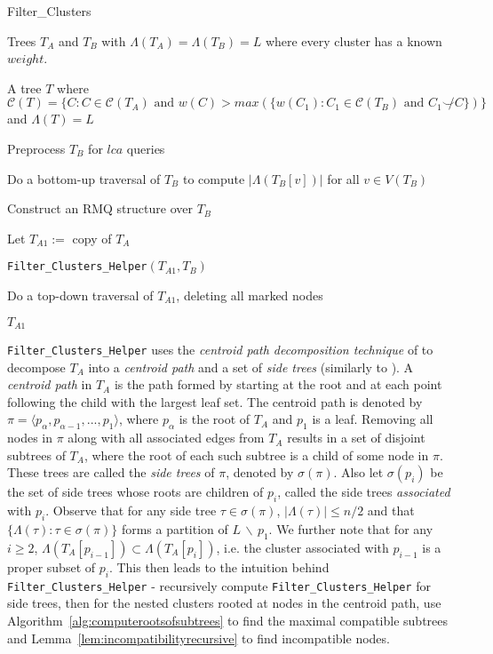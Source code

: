 \documentclass{article}
\newcommand{\compatible}{\smile}
\newcommand{\leafset}{\Lambda}
\begin{document}
    \begin{algorithm}
        \caption{Filter\_Clusters}
        \begin{algorithmic}[1]
            \Input Trees $T_A$ and $T_B$ with $\leafset(T_A) = \leafset(T_B) = L$ where every cluster has a known $weight$.

            \Output A tree $T$ where $\mathcal{C}(T) = \{C : C \in \mathcal{C}(T_A) \text{ and } w(C) > max(\{w(C_1) : C_1 \in \mathcal{C}(T_B) \text{ and } C_1 \not\compatible C\})\}$ and $\leafset(T) = L$

            \State Preprocess $T_B$ for $lca$ queries

            \State Do a bottom-up traversal of $T_B$ to compute $|\leafset(T_B[v])|$ for all $v \in V(T_B)$

            \State Construct an RMQ structure over $T_B$

            \State Let $T_{A1} :=$ copy of $T_A$

            \State \texttt{Filter\_Clusters\_Helper}$(T_{A1}, T_B)$

            \State Do a top-down traversal of $T_{A1}$, deleting all marked nodes

            \State \Return $T_{A1}$
        \end{algorithmic}
    \end{algorithm}

    \texttt{Filter\_Clusters\_Helper} uses the \textit{centroid path decomposition technique} of \cite{cole2000n} to decompose $T_A$ into a \textit{centroid path} and a set of \textit{side trees} (similarly to \cite{jansson2018algorithms}). A \textit{centroid path} in $T_A$ is the path formed by starting at the root and at each point following the child with the largest leaf set. The centroid path is denoted by $\pi = \langle p_{\alpha}, p_{\alpha - 1}, ..., p_1 \rangle$, where $p_{\alpha}$ is the root of $T_A$ and $p_1$ is a leaf. Removing all nodes in $\pi$ along with all associated edges from $T_A$ results in a set of disjoint subtrees of $T_A$, where the root of each such subtree is a child of some node in $\pi$. These trees are called the \textit{side trees} of $\pi$, denoted by $\sigma(\pi)$. Also let $\sigma(p_i)$ be the set of side trees whose roots are children of $p_i$, called the side trees \textit{associated} with $p_i$. Observe that for any side tree $\tau \in \sigma(\pi)$, $|\leafset(\tau)| \leq n/2$ and that $\{\leafset(\tau) : \tau \in \sigma(\pi)\}$ forms a partition of $L\, \backslash\, {p_1}$. We further note that for any $i \geq 2$, $\leafset(T_A[p_{i - 1}]) \subset \leafset(T_A[p_i])$, i.e. the cluster associated with $p_{i-1}$ is a proper subset of $p_i$. This then leads to the intuition behind \texttt{Filter\_Clusters\_Helper} - recursively compute \texttt{Filter\_Clusters\_Helper} for side trees, then for the nested clusters rooted at nodes in the centroid path, use Algorithm~\ref{alg:computerootsofsubtrees} to find the maximal compatible subtrees and Lemma~\ref{lem:incompatibilityrecursive} to find incompatible nodes.
\end{document}
